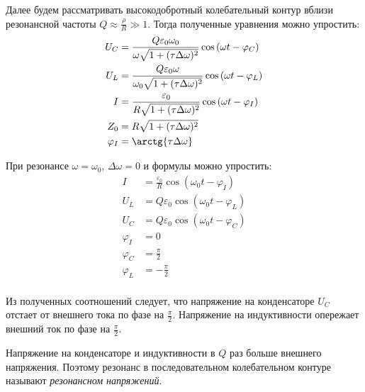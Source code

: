 Далее будем рассматривать высокодобротный колебательный контур вблизи резонансной частоты $Q \approx \frac{\rho}{R} \gg 1$. Тогда полученные уравнения можно упростить:
\begin{equation*}
	\begin{split}
		U_C &= \frac{Q \varepsilon_0 \omega_0}{\omega \sqrt{1 + (\tau \Delta \omega)^2}} \cos \left(\omega t - \varphi_C\right) \\
		U_L &= \frac{Q \varepsilon_0 \omega}{\omega_0 \sqrt{1 + (\tau \Delta \omega)^2}} \cos \left(\omega t - \varphi_L\right) \\
		I &= \frac{\varepsilon_0}{R \sqrt{1 + (\tau \Delta \omega)^2}} \cos \left(\omega t - \varphi_I\right) \\
		Z_0 &= R \sqrt{1 + (\tau \Delta \omega)^2} \\
		\varphi_I &= \arctg{\tau \Delta \omega}	
	\end{split}
\end{equation*}

При резонансе $\omega = \omega_0$, $\Delta \omega = 0$ и формулы можно упростить:
\begin{equation*}
	\begin{split}
		I &= \frac{\varepsilon_0}{R} \cos \left( \omega_0 t - \varphi_I \right) \\
		U_L &= Q \varepsilon_0 \cos \left( \omega_0 t - \varphi_L \right) \\
		U_C &= Q \varepsilon_0 \cos \left( \omega_0 t - \varphi_C \right) \\		
		\varphi_I &= 0 \\
		\varphi_C &= \frac{\pi}{2} \\
		\varphi_L &= -\frac{\pi}{2} \\
	\end{split}
\end{equation*}

Из полученных соотношений следует, что напряжение на конденсаторе $U_C$ отстает от внешнего тока по фазе на $\frac{\pi}{2}$. Напряжение на индуктивности опережает внешний ток по фазе на $\frac{\pi}{2}$.

Напряжение на конденсаторе и индуктивности в $Q$ раз больше внешнего напряжения. Поэтому резонанс в последовательном колебательном контуре называют \textit{резонансном напряжений}.

